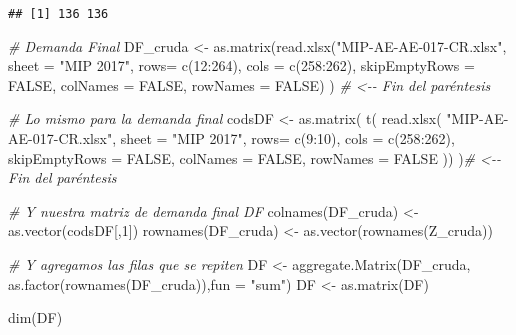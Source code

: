 \documentclass[
]{article}
\newenvironment{Shaded}{\begin{snugshade}}{\end{snugshade}}
\newcommand{\AttributeTok}[1]{\textcolor[rgb]{0.77,0.63,0.00}{#1}}
\newcommand{\CommentTok}[1]{\textcolor[rgb]{0.56,0.35,0.01}{\textit{#1}}}
\newcommand{\ConstantTok}[1]{\textcolor[rgb]{0.00,0.00,0.00}{#1}}
\newcommand{\DecValTok}[1]{\textcolor[rgb]{0.00,0.00,0.81}{#1}}
\newcommand{\FunctionTok}[1]{\textcolor[rgb]{0.00,0.00,0.00}{#1}}
\newcommand{\NormalTok}[1]{#1}
\newcommand{\OtherTok}[1]{\textcolor[rgb]{0.56,0.35,0.01}{#1}}
\newcommand{\SpecialCharTok}[1]{\textcolor[rgb]{0.00,0.00,0.00}{#1}}
\newcommand{\StringTok}[1]{\textcolor[rgb]{0.31,0.60,0.02}{#1}}
\begin{document}
\begin{verbatim}
## [1] 136 136
\end{verbatim}

\begin{Shaded}
\begin{Highlighting}[]
\CommentTok{\# Demanda Final}
\NormalTok{DF\_cruda }\OtherTok{\textless{}{-}} \FunctionTok{as.matrix}\NormalTok{(}\FunctionTok{read.xlsx}\NormalTok{(}\StringTok{"MIP{-}AE{-}AE{-}017{-}CR.xlsx"}\NormalTok{, }
                               \AttributeTok{sheet =} \StringTok{"MIP 2017"}\NormalTok{, }
                               \AttributeTok{rows=} \FunctionTok{c}\NormalTok{(}\DecValTok{12}\SpecialCharTok{:}\DecValTok{264}\NormalTok{), }
                               \AttributeTok{cols =} \FunctionTok{c}\NormalTok{(}\DecValTok{258}\SpecialCharTok{:}\DecValTok{262}\NormalTok{), }
                               \AttributeTok{skipEmptyRows =} \ConstantTok{FALSE}\NormalTok{, }
                               \AttributeTok{colNames =} \ConstantTok{FALSE}\NormalTok{, }
                               \AttributeTok{rowNames =} \ConstantTok{FALSE}\NormalTok{)}
\NormalTok{                     )  }\CommentTok{\# \textless{}{-}{-} Fin del paréntesis}


\CommentTok{\# Lo mismo para la demanda final}
\NormalTok{codsDF }\OtherTok{\textless{}{-}} \FunctionTok{as.matrix}\NormalTok{(}
  \FunctionTok{t}\NormalTok{(}
    \FunctionTok{read.xlsx}\NormalTok{(}
      \StringTok{"MIP{-}AE{-}AE{-}017{-}CR.xlsx"}\NormalTok{,}
      \AttributeTok{sheet =} \StringTok{"MIP 2017"}\NormalTok{, }
      \AttributeTok{rows=} \FunctionTok{c}\NormalTok{(}\DecValTok{9}\SpecialCharTok{:}\DecValTok{10}\NormalTok{), }
      \AttributeTok{cols =} \FunctionTok{c}\NormalTok{(}\DecValTok{258}\SpecialCharTok{:}\DecValTok{262}\NormalTok{), }
      \AttributeTok{skipEmptyRows =} \ConstantTok{FALSE}\NormalTok{,}
      \AttributeTok{colNames =} \ConstantTok{FALSE}\NormalTok{, }
      \AttributeTok{rowNames =} \ConstantTok{FALSE}
\NormalTok{  ))}
\NormalTok{)}\CommentTok{\# \textless{}{-}{-} Fin del paréntesis}

\CommentTok{\# Y nuestra matriz de demanda final DF}
\FunctionTok{colnames}\NormalTok{(DF\_cruda) }\OtherTok{\textless{}{-}} \FunctionTok{as.vector}\NormalTok{(codsDF[,}\DecValTok{1}\NormalTok{])}
\FunctionTok{rownames}\NormalTok{(DF\_cruda) }\OtherTok{\textless{}{-}} \FunctionTok{as.vector}\NormalTok{(}\FunctionTok{rownames}\NormalTok{(Z\_cruda))}

\CommentTok{\# Y agregamos las filas que se repiten}
\NormalTok{DF }\OtherTok{\textless{}{-}} \FunctionTok{aggregate.Matrix}\NormalTok{(DF\_cruda, }\FunctionTok{as.factor}\NormalTok{(}\FunctionTok{rownames}\NormalTok{(DF\_cruda)),}\AttributeTok{fun =} \StringTok{"sum"}\NormalTok{)}
\NormalTok{DF }\OtherTok{\textless{}{-}} \FunctionTok{as.matrix}\NormalTok{(DF)}

\FunctionTok{dim}\NormalTok{(DF)}
\end{Highlighting}
\end{Shaded}
\end{document}
